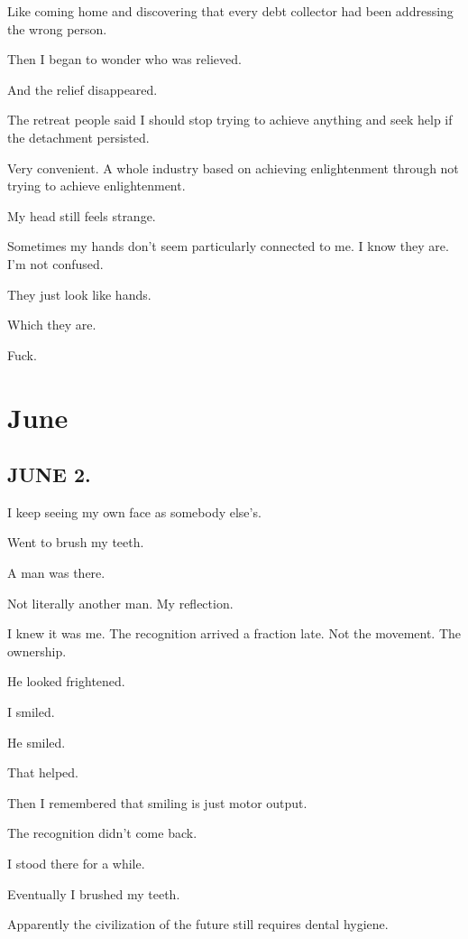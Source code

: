 \documentclass[11pt,oneside]{book}
\begin{document}
Like coming home and discovering that every debt collector had been addressing the wrong person.

Then I began to wonder who was relieved.

And the relief disappeared.

The retreat people said I should stop trying to achieve anything and seek help if the detachment persisted.

Very convenient. A whole industry based on achieving enlightenment through not trying to achieve enlightenment.

My head still feels strange.

Sometimes my hands don't seem particularly connected to me. I know they are. I'm not confused.

They just look like hands.

Which they are.

Fuck.

\chapter*{June}

\section*{JUNE 2.}

I keep seeing my own face as somebody else's.

Went to brush my teeth.

A man was there.

Not literally another man. My reflection.

I knew it was me. The recognition arrived a fraction late. Not the movement. The ownership.

He looked frightened.

I smiled.

He smiled.

That helped.

Then I remembered that smiling is just motor output.

The recognition didn't come back.

I stood there for a while.

Eventually I brushed my teeth.

Apparently the civilization of the future still requires dental hygiene.
\end{document}
